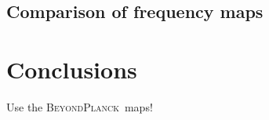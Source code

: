 \documentclass[twocolumn]{aa}
\newcommand{\BP}{\textsc{BeyondPlanck}}
\begin{document}
\subsection{Comparison of frequency maps}

\begin{figure*}
  \caption{Frequency maps for 30, 44 and 70 GHz for all datasets.}\label{fig:planck_instrument}
\end{figure*}

\begin{figure*}
  \caption{Comparing frequency maps from other dataset with \BP.}\label{fig:planck_instrument}
\end{figure*}


\begin{figure*}
  \caption{Half-mission comparison}\label{fig:planck_instrument}
\end{figure*}

\begin{figure*}
  \caption{Odd-even comparison}\label{fig:planck_instrument}
\end{figure*}

\begin{figure*}
  \caption{Year comparison?}\label{fig:planck_instrument}
\end{figure*}

\section{Conclusions}
\label{sec:summary}

Use the \BP\ maps!








\end{document}
